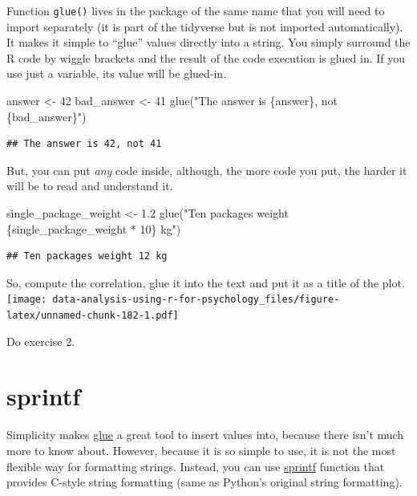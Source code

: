 \documentclass[
]{book}
\newenvironment{Shaded}{\begin{snugshade}}{\end{snugshade}}
\newcommand{\DecValTok}[1]{\textcolor[rgb]{0.00,0.00,0.81}{#1}}
\newcommand{\FloatTok}[1]{\textcolor[rgb]{0.00,0.00,0.81}{#1}}
\newcommand{\FunctionTok}[1]{\textcolor[rgb]{0.00,0.00,0.00}{#1}}
\newcommand{\NormalTok}[1]{#1}
\newcommand{\OtherTok}[1]{\textcolor[rgb]{0.56,0.35,0.01}{#1}}
\newcommand{\StringTok}[1]{\textcolor[rgb]{0.31,0.60,0.02}{#1}}
\begin{document}
Function \texttt{glue()} lives in the package of the same name that you will need to import separately (it is part of the tidyverse but is not imported automatically). It makes it simple to ``glue'' values directly into a string. You simply surround the R code by wiggle brackets and the result of the code execution is glued in. If you use just a variable, its value will be glued-in.

\begin{Shaded}
\begin{Highlighting}[]
\NormalTok{answer }\OtherTok{\textless{}{-}} \DecValTok{42}
\NormalTok{bad\_answer }\OtherTok{\textless{}{-}} \DecValTok{41}
\FunctionTok{glue}\NormalTok{(}\StringTok{"The answer is \{answer\}, not \{bad\_answer\}"}\NormalTok{)}
\end{Highlighting}
\end{Shaded}

\begin{verbatim}
## The answer is 42, not 41
\end{verbatim}

But, you can put \emph{any} code inside, although, the more code you put, the harder it will be to read and understand it.

\begin{Shaded}
\begin{Highlighting}[]
\NormalTok{single\_package\_weight }\OtherTok{\textless{}{-}} \FloatTok{1.2}
\FunctionTok{glue}\NormalTok{(}\StringTok{"Ten packages weight \{single\_package\_weight * 10\} kg"}\NormalTok{)}
\end{Highlighting}
\end{Shaded}

\begin{verbatim}
## Ten packages weight 12 kg
\end{verbatim}

So, compute the correlation, glue it into the text and put it as a title of the plot.
\texttt{[image: data-analysis-using-r-for-psychology\_files/figure-latex/unnamed-chunk-182-1.pdf]}

Do exercise 2.

\hypertarget{sprintf}{%
\section{sprintf}\label{sprintf}}

Simplicity makes \href{https://glue.tidyverse.org/}{glue} a great tool to insert values into, because there isn't much more to know about. However, because it is so simple to use, it is not the most flexible way for formatting strings. Instead, you can use \href{https://stat.ethz.ch/R-manual/R-patched/library/base/html/sprintf.html}{sprintf} function that provides C-style string formatting (same as Python's original string formatting).
\end{document}
